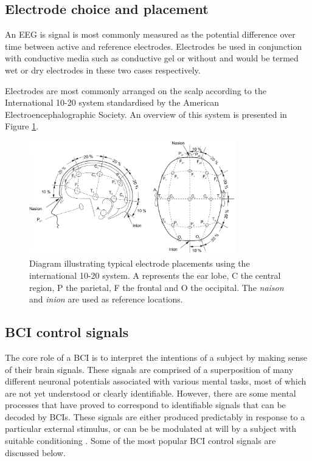 \subsection{Electrode choice and placement}
An EEG is signal is most commonly measured as the potential difference over time between active and reference electrodes. Electrodes be used in conjunction with conductive media such as conductive gel or without and would be termed wet or dry electrodes in these two cases respectively. 

Electrodes are most commonly arranged on the scalp according to the International 10-20 system standardised by the American Electroencephalographic Society. An overview of this system is presented in Figure \ref{fig:10-20-positions}.

\begin{figure}[h]
    \centering
    \includegraphics[width=0.8\textwidth]{10-20-electrode.png}
    \caption[Electrode positions according to the 10-20 system]{Diagram illustrating typical electrode placements using the international 10-20 system. A represents the ear lobe, C the central region, P the parietal, F the frontal and O the occipital. The \textit{naison} and \textit{inion} are used as reference locations.}
    \label{fig:10-20-positions}
\end{figure}

\subsection{BCI control signals}
The core role of a BCI is to interpret the intentions of a subject by making sense of their brain signals. These signals are comprised of a superposition of many different neuronal potentials associated with various mental tasks, most of which are not yet understood or clearly identifiable. However, there are some mental processes that have proved to correspond to identifiable signals that can be decoded by BCIs. These signals are either produced predictably in response to a particular external stimulus, or can be be modulated at will by a subject with suitable conditioning \cite{bci-survey-nicolas-alonso}. Some of the most popular BCI control signals are discussed below.

